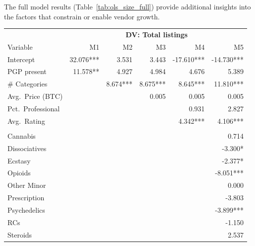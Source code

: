\documentclass{article}
\begin{document}
The full model results (Table~\ref{tab:ols_size_full}) provide additional insights into the factors that constrain or enable vendor growth.

\begin{table}[htbp]
  \centering
  \scriptsize
  \setlength\tabcolsep{4pt}
  \begin{tabular}{lrrrrr}
    \toprule
    & \multicolumn{5}{c}{\textbf{DV: Total listings}}\\
    \cmidrule(lr){2-6}
    Variable & M1 & M2 & M3 & M4 & M5\\
    \midrule
    Intercept               & 32.076*** & 3.531     & 3.443     & -17.610*** & -14.730***\\
    PGP present             & 11.578**  & 4.927     & 4.984     & 4.676      & 5.389\\
    \# Categories           &           & 8.674***  & 8.675***  & 8.645***   & 11.810***\\
    Avg.\ Price (BTC)       &           &           & 0.005     & 0.005      & 0.005\\
    Pct.\ Professional      &           &           &           & 0.931      & 2.827\\
    Avg.\ Rating            &           &           &           & 4.342***   & 4.106***\\
    \addlinespace
    \multicolumn{6}{l}{\emph{Primary drug class}}\\
    Cannabis                &           &           &           &            & 0.714\\
    Dissociatives           &           &           &           &            & -3.300*\\
    Ecstasy                 &           &           &           &            & -2.377*\\
    Opioids                 &           &           &           &            & -8.051***\\
    Other Minor             &           &           &           &            & 0.000\\
    Prescription            &           &           &           &            & -3.803\\
    Psychedelics            &           &           &           &            & -3.899***\\
    RCs                     &           &           &           &            & -1.150\\
    Steroids                &           &           &           &            & 2.537\\

\end{tabular}
\end{table}
\end{document}
